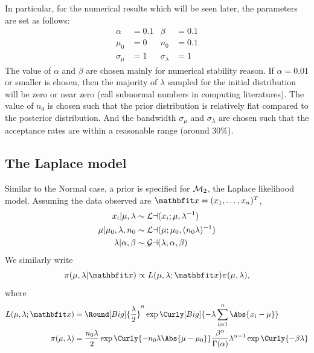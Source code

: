 \begin{remark}
  In particular, for the numerical results which will be seen later, the
  parameters are set as follows:
  \begin{align*}
    \alpha       &= 0.1 & \beta          &= 0.1 \\
    \mu_0        &= 0 & n_0              &= 0.1 \\
    \sigma_{\mu} &= 1 & \sigma_{\lambda} &= 1
  \end{align*}
  The value of $\alpha$ and $\beta$ are chosen mainly for numerical stability
  reason. If $\alpha = 0.01$ or smaller is chosen, then the majority of
  $\lambda$ sampled for the initial distribution will be zero or near zero
  (call subnormal numbers in computing literatures). The value of $n_0$ is
  chosen such that the prior distribution is relatively flat compared to the
  posterior distribution. And the \mha bandwidth $\sigma_{\mu}$ and
  $\sigma_{\lambda}$ are chosen such that the acceptance rates are within a
  reasonable range (around $30\%$).
\end{remark}

\subsection{The Laplace model}

Similar to the Normal case, a prior is specified for $\mathcal{M}_2$, the Laplace
likelihood model. Assuming the data observed are $\x = (x_1,\dots,x_n)^T$,
\begin{align}
  x_i | \mu,\lambda &\sim \mathcal{La}(x_i;\mu,\lambda^{-1}) \\
  \mu | \mu_0,\lambda,n_0 &\sim \mathcal{La}(\mu;\mu_0, (n_0\lambda)^{-1}) \\
  \lambda | \alpha,\beta &\sim \mathcal{Ga}(\lambda; \alpha, \beta)
\end{align}
We similarly write 
\begin{equation}
  \pi(\mu,\lambda|\x) \propto
  L(\mu,\lambda;\x)\pi(\mu,\lambda),
  \label{eq:laplace_posterior}
\end{equation}
where
\begin{align}
  L(\mu,\lambda;\x) &= \Round[Big]{\frac{\lambda}{2}}^n
  \exp\Curly[Big]{-\lambda\sum_{i=1}^n\Abs{x_i - \mu}}
  \label{eq:likelihood_laplace}\\
  \pi(\mu,\lambda) &= \frac{n_0\lambda}{2}
  \exp\Curly{-n_0\lambda\Abs{\mu - \mu_0}}
  \frac{\beta^{\alpha}}{\Gamma(\alpha)}
  \lambda^{\alpha - 1}\exp\Curly{-\beta\lambda}
  \label{eq:prior_laplace}
\end{align}

